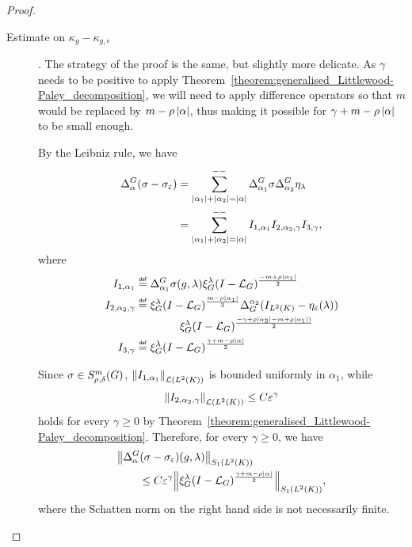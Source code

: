 \begin{proof}
\begin{description}
        \item[Estimate on $\kappa_g - \kappa_{g, \epsilon}$].
            The strategy of the proof is the same,
            but slightly more delicate.
            As $\gamma$ needs to be positive to apply Theorem~\ref{theorem:generalised_Littlewood-Paley_decomposition},
            we will need to apply difference operators so that $m$ would be replaced by $m - \rho \abs \alpha$,
            thus making it possible for $\gamma + m - \rho \abs \alpha$ to be small enough.

            By the Leibniz rule,
            we have
            \begin{align*}
                \DifferenceOperator \alpha (\sigma - \sigma_\epsilon)
                &= \lcsum{\abs {\alpha_1} + \abs {\alpha_2} = \abs \alpha}
                \DifferenceOperator {\alpha_1} \sigma \DifferenceOperator {\alpha_2} \eta_\lambda\\
                &= \lcsum{\abs {\alpha_1} + \abs {\alpha_2} = \abs \alpha}
                I_{1, \alpha_1} I_{2, \alpha_2, \gamma} I_{3, \gamma},
            \end{align*}
            where
            \begin{align*}
                I_{1, \alpha_1} &\defeq \DifferenceOperator {\alpha_1} \sigma(g, \lambda) \Rep \lambda \BesselPotential {-m + \rho \abs {\alpha_1}}\\
                I_{2, \alpha_2, \gamma} &\defeq \Rep \lambda \BesselPotential {m - \rho \abs {\alpha_1}} \DifferenceOperatorOrder {\alpha_2} (\Id {\Lebesgue 2 \CompactGroup} - \eta_\epsilon(\lambda))\\
                &\qquad \qquad\Rep \lambda \BesselPotential {-\gamma + \rho \abs {\alpha_2} - m + \rho \abs {\alpha_1})}\\
                I_{3, \gamma} &\defeq \Rep \lambda \BesselPotential {\gamma + m - \rho \abs \alpha}
            \end{align*}

            Since $\sigma \in \SymbolClass m {\rho, \delta}$,
            $\norm [\Lin {\Lebesgue 2 \CompactGroup}] {I_{1, \alpha_1}}$ is bounded uniformly in $\alpha_1$,
            while
            \begin{align*}
                \norm [\Lin {\Lebesgue 2 \CompactGroup}] {I_{2, \alpha_2, \gamma}}
                \leq C \epsilon^\gamma
            \end{align*}
            holds for every $\gamma \geq 0$ by Theorem~\ref{theorem:generalised_Littlewood-Paley_decomposition}.
            Therefore, for every $\gamma \geq 0$, we have
            \begin{align*}
                &\norm [\SchattenClasses 1 {\Lebesgue 2 \CompactGroup}] {\DifferenceOperator \alpha (\sigma - \sigma_\epsilon)(g, \lambda)}\\
                & \qquad \leq C \epsilon^\gamma
                \norm [\SchattenClasses 1 {\Lebesgue 2 \CompactGroup}] {\Rep \lambda \BesselPotential {\gamma + m - \rho \abs \alpha}},
            \end{align*}
            where the Schatten norm on the right hand side is not necessarily finite.


\end{description}
\end{proof}
